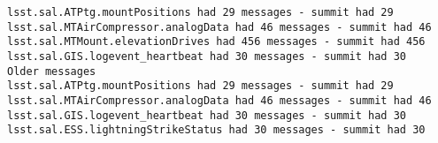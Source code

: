 \begin{lstlisting}
lsst.sal.ATPtg.mountPositions had 29 messages - summit had 29
lsst.sal.MTAirCompressor.analogData had 46 messages - summit had 46
lsst.sal.MTMount.elevationDrives had 456 messages - summit had 456
lsst.sal.GIS.logevent_heartbeat had 30 messages - summit had 30
Older messages
lsst.sal.ATPtg.mountPositions had 29 messages - summit had 29
lsst.sal.MTAirCompressor.analogData had 46 messages - summit had 46
lsst.sal.GIS.logevent_heartbeat had 30 messages - summit had 30
lsst.sal.ESS.lightningStrikeStatus had 30 messages - summit had 30
\end{lstlisting}

